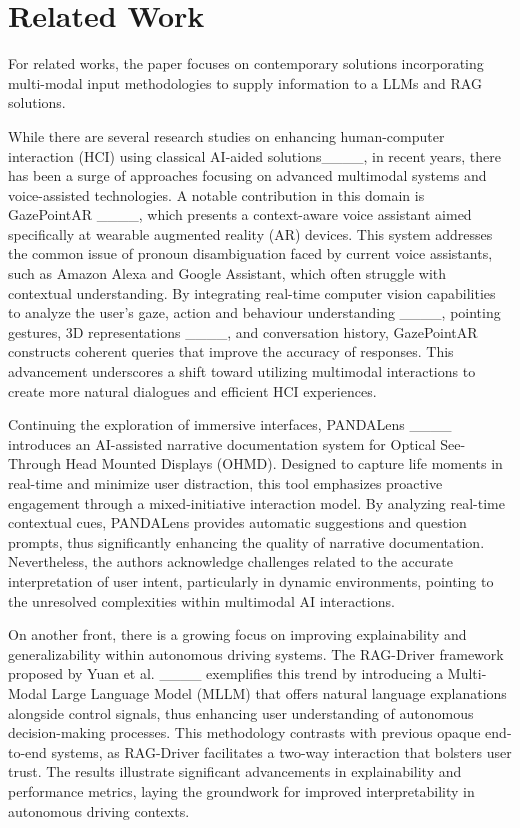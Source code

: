 \section{Related Work}
For related works, the paper focuses on contemporary solutions incorporating multi-modal input methodologies to supply information to a LLMs and RAG solutions.

While there are several research studies on enhancing human-computer interaction (HCI) using classical AI-aided solutions____, in recent years, there has been a surge of approaches focusing on advanced multimodal systems and voice-assisted technologies. A notable contribution in this domain is GazePointAR ____, which presents a context-aware voice assistant aimed specifically at wearable augmented reality (AR) devices. This system addresses the common issue of pronoun disambiguation faced by current voice assistants, such as Amazon Alexa and Google Assistant, which often struggle with contextual understanding. By integrating real-time computer vision capabilities to analyze the user's gaze, action and behaviour understanding ____, pointing gestures, 3D representations ____, and conversation history, GazePointAR constructs coherent queries that improve the accuracy of responses. This advancement underscores a shift toward utilizing multimodal interactions to create more natural dialogues and efficient HCI experiences.

Continuing the exploration of immersive interfaces, PANDALens ____ introduces an AI-assisted narrative documentation system for Optical See-Through Head Mounted Displays (OHMD). Designed to capture life moments in real-time and minimize user distraction, this tool emphasizes proactive engagement through a mixed-initiative interaction model. By analyzing real-time contextual cues, PANDALens provides automatic suggestions and question prompts, thus significantly enhancing the quality of narrative documentation. Nevertheless, the authors acknowledge challenges related to the accurate interpretation of user intent, particularly in dynamic environments, pointing to the unresolved complexities within multimodal AI interactions.

On another front, there is a growing focus on improving explainability and generalizability within autonomous driving systems. The RAG-Driver framework proposed by Yuan et al. ____ exemplifies this trend by introducing a Multi-Modal Large Language Model (MLLM) that offers natural language explanations alongside control signals, thus enhancing user understanding of autonomous decision-making processes. This methodology contrasts with previous opaque end-to-end systems, as RAG-Driver facilitates a two-way interaction that bolsters user trust. The results illustrate significant advancements in explainability and performance metrics, laying the groundwork for improved interpretability in autonomous driving contexts.

